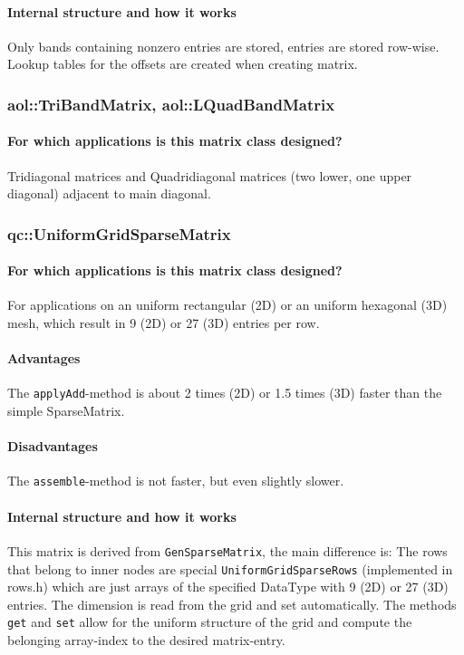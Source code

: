 \paragraph{Internal structure and how it works}
Only bands containing nonzero entries are stored, entries are stored
row-wise. Lookup tables for the offsets are created when creating
matrix.

\subsubsection{aol::TriBandMatrix, aol::LQuadBandMatrix}
\paragraph{For which applications is this matrix class designed?}
Tridiagonal matrices and Quadridiagonal matrices (two lower, one upper
diagonal) adjacent to main diagonal.


\subsubsection{qc::UniformGridSparseMatrix}
\paragraph{For which applications is this matrix class designed?}
For applications on an uniform rectangular (2D) or an uniform hexagonal (3D) mesh,
which result in 9 (2D) or 27 (3D) entries per row.

\paragraph{Advantages}
The \texttt{applyAdd}-method is about 2 times (2D) or
1.5 times (3D) faster than the simple SparseMatrix.

\paragraph{Disadvantages}
The \texttt{assemble}-method is not faster, but even slightly slower.

\paragraph{Internal structure and how it works}
This matrix is derived from \texttt{GenSparseMatrix}, the main
difference is: The rows that belong to inner nodes are special
\texttt{UniformGridSparseRows} (implemented in rows.h) which are just
arrays of the specified DataType with 9 (2D) or 27 (3D) entries.  The
dimension is read from the grid and set automatically. The methods
\texttt{get} and \texttt{set} allow for the uniform structure of the
grid and compute the belonging array-index to the desired
matrix-entry.

